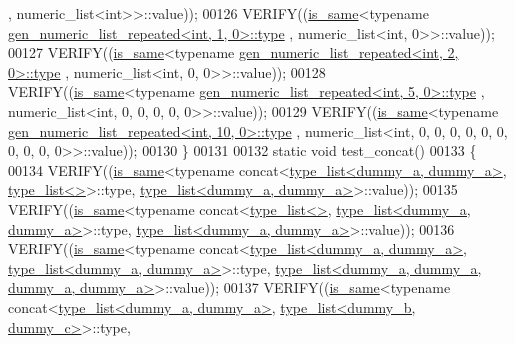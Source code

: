 \begin{DoxyCode}
      , numeric\_list<int>>::value));
00126   VERIFY((\hyperlink{struct_eigen_1_1internal_1_1is__same}{is\_same}<\textcolor{keyword}{typename} \hyperlink{struct_eigen_1_1internal_1_1gen__numeric__list__repeated}{gen\_numeric\_list\_repeated<int, 1, 0>::type}
      , numeric\_list<int, 0>>::value));
00127   VERIFY((\hyperlink{struct_eigen_1_1internal_1_1is__same}{is\_same}<\textcolor{keyword}{typename} \hyperlink{struct_eigen_1_1internal_1_1gen__numeric__list__repeated}{gen\_numeric\_list\_repeated<int, 2, 0>::type}
      , numeric\_list<int, 0, 0>>::value));
00128   VERIFY((\hyperlink{struct_eigen_1_1internal_1_1is__same}{is\_same}<\textcolor{keyword}{typename} \hyperlink{struct_eigen_1_1internal_1_1gen__numeric__list__repeated}{gen\_numeric\_list\_repeated<int, 5, 0>::type}
      , numeric\_list<int, 0, 0, 0, 0, 0>>::value));
00129   VERIFY((\hyperlink{struct_eigen_1_1internal_1_1is__same}{is\_same}<\textcolor{keyword}{typename} \hyperlink{struct_eigen_1_1internal_1_1gen__numeric__list__repeated}{gen\_numeric\_list\_repeated<int, 10, 0>::type}
      , numeric\_list<int, 0, 0, 0, 0, 0, 0, 0, 0, 0, 0>>::value));
00130 \}
00131 
00132 \textcolor{keyword}{static} \textcolor{keywordtype}{void} test\_concat()
00133 \{
00134   VERIFY((\hyperlink{struct_eigen_1_1internal_1_1is__same}{is\_same}<\textcolor{keyword}{typename} concat<\hyperlink{struct_eigen_1_1internal_1_1type__list}{type\_list<dummy\_a, dummy\_a>}, 
      \hyperlink{struct_eigen_1_1internal_1_1type__list}{type\_list<>}>::type, \hyperlink{struct_eigen_1_1internal_1_1type__list}{type\_list<dummy\_a, dummy\_a>}>::value));
00135   VERIFY((\hyperlink{struct_eigen_1_1internal_1_1is__same}{is\_same}<\textcolor{keyword}{typename} concat<\hyperlink{struct_eigen_1_1internal_1_1type__list}{type\_list<>}, 
      \hyperlink{struct_eigen_1_1internal_1_1type__list}{type\_list<dummy\_a, dummy\_a>}>::type, 
      \hyperlink{struct_eigen_1_1internal_1_1type__list}{type\_list<dummy\_a, dummy\_a>}>::value));
00136   VERIFY((\hyperlink{struct_eigen_1_1internal_1_1is__same}{is\_same}<\textcolor{keyword}{typename} concat<\hyperlink{struct_eigen_1_1internal_1_1type__list}{type\_list<dummy\_a, dummy\_a>}, 
      \hyperlink{struct_eigen_1_1internal_1_1type__list}{type\_list<dummy\_a, dummy\_a>}>::type, 
      \hyperlink{struct_eigen_1_1internal_1_1type__list}{type\_list<dummy\_a, dummy\_a, dummy\_a, dummy\_a>}>::value));
00137   VERIFY((\hyperlink{struct_eigen_1_1internal_1_1is__same}{is\_same}<\textcolor{keyword}{typename} concat<\hyperlink{struct_eigen_1_1internal_1_1type__list}{type\_list<dummy\_a, dummy\_a>}, 
      \hyperlink{struct_eigen_1_1internal_1_1type__list}{type\_list<dummy\_b, dummy\_c>}>::type, 

\end{DoxyCode}
